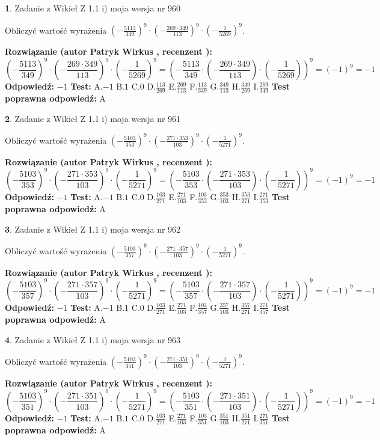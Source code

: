 \documentclass[12pt, a4paper]{article}
\theoremstyle{definition} %
\newtheorem{zad}{}
\newcommand{\zadStart}[1]{\begin{zad}#1\newline}
\newcommand{\zadStop}{\end{zad}}
\newcommand{\rozwStart}[2]{\noindent \textbf{Rozwiązanie (autor #1 , recenzent #2): }\newline}
\newcommand{\rozwStop}{\newline}
\newcommand{\odpStart}{\noindent \textbf{Odpowiedź:}\newline}
\newcommand{\odpStop}{\newline}
\newcommand{\testStart}{\noindent \textbf{Test:}\newline}
\newcommand{\testStop}{\newline}
\newcommand{\kluczStart}{\noindent \textbf{Test poprawna odpowiedź:}\newline}
\newcommand{\kluczStop}{\newline}
\begin{document}
\zadStart{Zadanie z Wikieł Z 1.1 i) moja wersja nr 960}

Obliczyć wartość wyrażenia $(-\frac{5113}{349})^{9} \cdot (-\frac{269 \cdot 349}{113})^{9} \cdot (-\frac{1}{5269})^{9}$.
\zadStop
\rozwStart{Patryk Wirkus}{}
$$(-\frac{5113}{349})^{9} \cdot (-\frac{269 \cdot 349}{113})^{9} \cdot (-\frac{1}{5269})^{9} = (-\frac{5113}{349} \cdot (-\frac{269 \cdot 349}{113}) \cdot (-\frac{1}{5269}))^{9} = (-1)^{9} = -1$$
\rozwStop
\odpStart
$-1$
\odpStop
\testStart
A.$-1$ B.$1$ C.$0$ D.$\frac{113}{269}$ E.$\frac{269}{113}$
F.$\frac{113}{349}$ G.$\frac{349}{113}$
H.$\frac{349}{269}$
I.$\frac{269}{349}$
\testStop
\kluczStart
A
\kluczStop



\zadStart{Zadanie z Wikieł Z 1.1 i) moja wersja nr 961}

Obliczyć wartość wyrażenia $(-\frac{5103}{353})^{9} \cdot (-\frac{271 \cdot 353}{103})^{9} \cdot (-\frac{1}{5271})^{9}$.
\zadStop
\rozwStart{Patryk Wirkus}{}
$$(-\frac{5103}{353})^{9} \cdot (-\frac{271 \cdot 353}{103})^{9} \cdot (-\frac{1}{5271})^{9} = (-\frac{5103}{353} \cdot (-\frac{271 \cdot 353}{103}) \cdot (-\frac{1}{5271}))^{9} = (-1)^{9} = -1$$
\rozwStop
\odpStart
$-1$
\odpStop
\testStart
A.$-1$ B.$1$ C.$0$ D.$\frac{103}{271}$ E.$\frac{271}{103}$
F.$\frac{103}{353}$ G.$\frac{353}{103}$
H.$\frac{353}{271}$
I.$\frac{271}{353}$
\testStop
\kluczStart
A
\kluczStop



\zadStart{Zadanie z Wikieł Z 1.1 i) moja wersja nr 962}

Obliczyć wartość wyrażenia $(-\frac{5103}{357})^{9} \cdot (-\frac{271 \cdot 357}{103})^{9} \cdot (-\frac{1}{5271})^{9}$.
\zadStop
\rozwStart{Patryk Wirkus}{}
$$(-\frac{5103}{357})^{9} \cdot (-\frac{271 \cdot 357}{103})^{9} \cdot (-\frac{1}{5271})^{9} = (-\frac{5103}{357} \cdot (-\frac{271 \cdot 357}{103}) \cdot (-\frac{1}{5271}))^{9} = (-1)^{9} = -1$$
\rozwStop
\odpStart
$-1$
\odpStop
\testStart
A.$-1$ B.$1$ C.$0$ D.$\frac{103}{271}$ E.$\frac{271}{103}$
F.$\frac{103}{357}$ G.$\frac{357}{103}$
H.$\frac{357}{271}$
I.$\frac{271}{357}$
\testStop
\kluczStart
A
\kluczStop



\zadStart{Zadanie z Wikieł Z 1.1 i) moja wersja nr 963}

Obliczyć wartość wyrażenia $(-\frac{5103}{351})^{9} \cdot (-\frac{271 \cdot 351}{103})^{9} \cdot (-\frac{1}{5271})^{9}$.
\zadStop
\rozwStart{Patryk Wirkus}{}
$$(-\frac{5103}{351})^{9} \cdot (-\frac{271 \cdot 351}{103})^{9} \cdot (-\frac{1}{5271})^{9} = (-\frac{5103}{351} \cdot (-\frac{271 \cdot 351}{103}) \cdot (-\frac{1}{5271}))^{9} = (-1)^{9} = -1$$
\rozwStop
\odpStart
$-1$
\odpStop
\testStart
A.$-1$ B.$1$ C.$0$ D.$\frac{103}{271}$ E.$\frac{271}{103}$
F.$\frac{103}{351}$ G.$\frac{351}{103}$
H.$\frac{351}{271}$
I.$\frac{271}{351}$
\testStop
\kluczStart
A
\kluczStop
\end{document}
